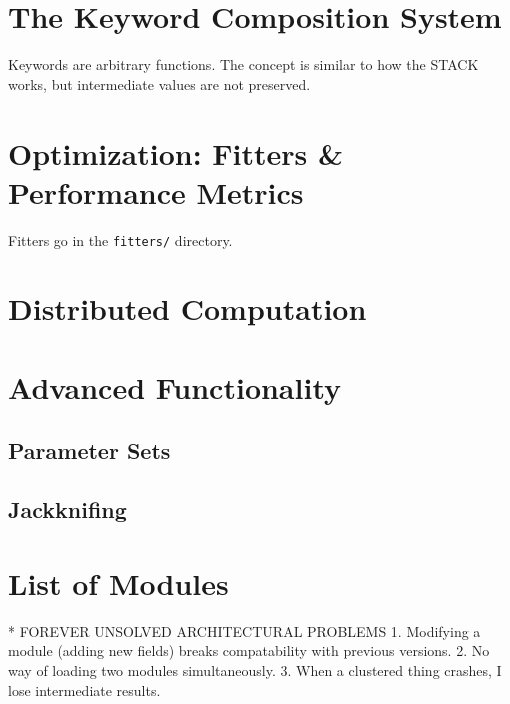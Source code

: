 \documentclass[letterpaper]{report}
\newcommand{\matlab}[1]{\texttt{#1}}
\begin{document}
\chapter{The Keyword Composition System}

Keywords are arbitrary functions. The concept is similar to how the STACK works, but intermediate values are not preserved. 

\chapter{Optimization: Fitters \& Performance Metrics}

Fitters go in the \matlab{fitters/} directory. 

\chapter{Distributed Computation}

\chapter{Advanced Functionality}

\section{Parameter Sets}

\section{Jackknifing}



\chapter{List of Modules}

* FOREVER UNSOLVED ARCHITECTURAL PROBLEMS
  1. Modifying a module (adding new fields) breaks compatability with previous versions.
  2. No way of loading two modules simultaneously.
  3. When a clustered thing crashes, I lose intermediate results. 
\end{document}
